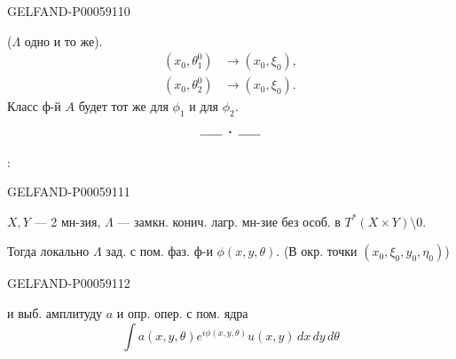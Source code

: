 \begin{GelfandAdjacentEvidence}{GELFAND-P000591}{10}

(\(\Lambda\) одно и то же).
\[
\begin{aligned}
(x_0,\theta_1^0)&\longrightarrow(x_0,\xi_0),\\
(x_0,\theta_2^0)&\longrightarrow(x_0,\xi_0).
\end{aligned}
\]
Класс ф-й \(A\) будет тот же для \(\phi_1\) и для \(\phi_2\).
\[
\rule{1.8em}{.4pt}\;\boldsymbol{\cdot}\;\rule{1.8em}{.4pt}
\]

:
\end{GelfandAdjacentEvidence}
\begin{GelfandAdjacentEvidence}{GELFAND-P000591}{11}

\(X,Y\) — 2 мн-зия, \(\Lambda\) — замкн. конич. лагр. мн-зие без особ.
в \(T^*(X\times Y)\setminus0\).

Тогда локально \(\Lambda\) зад. с пом. фаз. ф-и
\(\phi(x,y,\theta)\).
(В окр. точки \((x_0,\xi_0,y_0,\eta_0)\))
\end{GelfandAdjacentEvidence}
\begin{GelfandAdjacentEvidence}{GELFAND-P000591}{12}

и выб. амплитуду \(a\) и опр. опер. с пом. ядра
\[
\int a(x,y,\theta)e^{i\phi(x,y,\theta)}u(x,y)\,dx\,dy\,d\theta
\]
\end{GelfandAdjacentEvidence}



